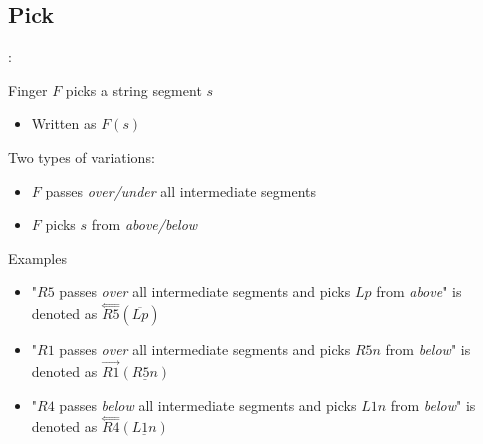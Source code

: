 \subsection{Pick}
\begin{frame}{\secname: \subsecname}

Finger $F$ picks a string segment $s$ 

\begin{itemize}
    \item Written as $F(s)$
\end{itemize}

\pause Two types of variations:
\begin{itemize}[<+(1)->]
    \item $F$ passes \emph{over/under} all intermediate segments
    \item $F$ picks $s$ from \emph{above/below}
\end{itemize}

\pause Examples
\begin{itemize}[<+(1)->]
    \item "$R5$ passes \emph{over} all intermediate segments and picks $Lp$ from \emph{above}" is denoted  as $\overset\Longleftarrow{R5}(\overline{Lp})$
    \item "$R1$ passes \emph{over} all intermediate segments and picks $R5n$ from \emph{below}" is denoted as $\overrightarrow{R1}(\underline{R5n})$
    \item "$R4$ passes \emph{below} all intermediate segments and picks $L1n$ from \emph{below}" is denoted as $\overset\Longleftarrow{R4}(\underline{L1n})$
\end{itemize}
\end{frame}


